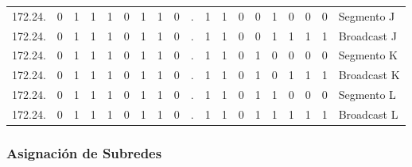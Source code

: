 \begin{center}
{\begin{tabular}{r cccccccc c cccccccc l}
172.24. & 0 & 1 & 1 & 1 & 0 & 1 & 1 & 0 & . & 1 & 1 & 0 & 0 & \multicolumn{1}{c|}{1} & 0 & 0 & 0 & Segmento J \\
172.24. & 0 & 1 & 1 & 1 & 0 & 1 & 1 & 0 & . & 1 & 1 & 0 & 0 & \multicolumn{1}{c|}{1} & 1 & 1 & 1 & Broadcast J \\
\addlinespace

172.24. & 0 & 1 & 1 & 1 & 0 & 1 & 1 & 0 & . & 1 & 1 & 0 & 1 & \multicolumn{1}{c|}{0} & 0 & 0 & 0 & Segmento K \\
172.24. & 0 & 1 & 1 & 1 & 0 & 1 & 1 & 0 & . & 1 & 1 & 0 & 1 & \multicolumn{1}{c|}{0} & 1 & 1 & 1 & Broadcast K \\
\addlinespace

172.24. & 0 & 1 & 1 & 1 & 0 & 1 & 1 & 0 & . & 1 & 1 & 0 & 1 & \multicolumn{1}{c|}{1} & 0 & 0 & 0 & Segmento L \\
172.24. & 0 & 1 & 1 & 1 & 0 & 1 & 1 & 0 & . & 1 & 1 & 0 & 1 & \multicolumn{1}{c|}{1} & 1 & 1 & 1 & Broadcast L \\
\bottomrule
\end{tabular}
}
\end{center}
\vspace{15pt}

\subsubsection*{Asignación de Subredes}

